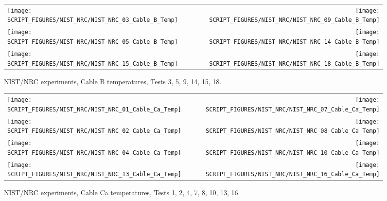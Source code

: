 \begin{figure}[p]
\begin{tabular*}{\textwidth}{l@{\extracolsep{\fill}}r}
\texttt{[image: SCRIPT\_FIGURES/NIST\_NRC/NIST\_NRC\_03\_Cable\_B\_Temp]} &
\texttt{[image: SCRIPT\_FIGURES/NIST\_NRC/NIST\_NRC\_09\_Cable\_B\_Temp]} \\
\texttt{[image: SCRIPT\_FIGURES/NIST\_NRC/NIST\_NRC\_05\_Cable\_B\_Temp]} &
\texttt{[image: SCRIPT\_FIGURES/NIST\_NRC/NIST\_NRC\_14\_Cable\_B\_Temp]} \\
\texttt{[image: SCRIPT\_FIGURES/NIST\_NRC/NIST\_NRC\_15\_Cable\_B\_Temp]} &
\texttt{[image: SCRIPT\_FIGURES/NIST\_NRC/NIST\_NRC\_18\_Cable\_B\_Temp]}
\end{tabular*}
\caption[NIST/NRC experiments, Cable B temperatures, Tests 3, 5, 9, 14, 15, 18]{NIST/NRC experiments, Cable B temperatures, Tests 3, 5, 9, 14, 15, 18.}
\label{NIST_NRC_Cable_B_Open}
\end{figure}

\begin{figure}[p]
\begin{tabular*}{\textwidth}{l@{\extracolsep{\fill}}r}
\texttt{[image: SCRIPT\_FIGURES/NIST\_NRC/NIST\_NRC\_01\_Cable\_Ca\_Temp]} &
\texttt{[image: SCRIPT\_FIGURES/NIST\_NRC/NIST\_NRC\_07\_Cable\_Ca\_Temp]} \\
\texttt{[image: SCRIPT\_FIGURES/NIST\_NRC/NIST\_NRC\_02\_Cable\_Ca\_Temp]} &
\texttt{[image: SCRIPT\_FIGURES/NIST\_NRC/NIST\_NRC\_08\_Cable\_Ca\_Temp]} \\
\texttt{[image: SCRIPT\_FIGURES/NIST\_NRC/NIST\_NRC\_04\_Cable\_Ca\_Temp]} &
\texttt{[image: SCRIPT\_FIGURES/NIST\_NRC/NIST\_NRC\_10\_Cable\_Ca\_Temp]} \\
\texttt{[image: SCRIPT\_FIGURES/NIST\_NRC/NIST\_NRC\_13\_Cable\_Ca\_Temp]} &
\texttt{[image: SCRIPT\_FIGURES/NIST\_NRC/NIST\_NRC\_16\_Cable\_Ca\_Temp]}
\end{tabular*}
\caption[NIST/NRC experiments, Cable Ca temperatures, Tests 1, 2, 4, 7, 8, 10, 13, 16]{NIST/NRC experiments, Cable Ca temperatures, Tests 1, 2, 4, 7, 8, 10, 13, 16.}
\label{NIST_NRC_Cable_Ca_Closed}
\end{figure}

